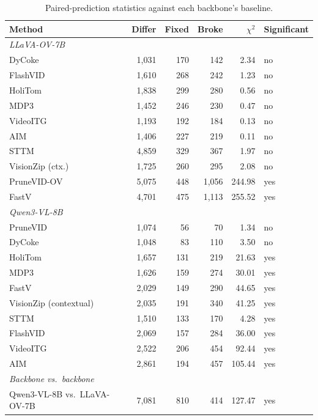 \documentclass[11pt]{article}
\begin{document}
\begin{table}[H]
  \centering
  \small
  \caption{Paired-prediction statistics against each backbone's baseline.}
  \label{tab:verif}
  \begin{tabular}{lrrrrl}
    \toprule
    Method & Differ & Fixed & Broke & $\chi^2$ & Significant \\
    \midrule
    \multicolumn{6}{l}{\textit{LLaVA-OV-7B}} \\
    DyCoke & 1{,}031 & 170 & 142 & 2.34 & no \\
    FlashVID & 1{,}610 & 268 & 242 & 1.23 & no \\
    HoliTom & 1{,}838 & 299 & 280 & 0.56 & no \\
    MDP3 & 1{,}452 & 246 & 230 & 0.47 & no \\
    VideoITG & 1{,}193 & 192 & 184 & 0.13 & no \\
    AIM & 1{,}406 & 227 & 219 & 0.11 & no \\
    STTM & 4{,}859 & 329 & 367 & 1.97 & no \\
    VisionZip (ctx.) & 1{,}725 & 260 & 295 & 2.08 & no \\
    PruneVID-OV & 5{,}075 & 448 & 1{,}056 & 244.98 & yes \\
    FastV & 4{,}701 & 475 & 1{,}113 & 255.52 & yes \\
    \midrule
    \multicolumn{6}{l}{\textit{Qwen3-VL-8B}} \\
    PruneVID & 1{,}074 & 56 & 70 & 1.34 & no \\
    DyCoke & 1{,}048 & 83 & 110 & 3.50 & no \\
    HoliTom & 1{,}657 & 131 & 219 & 21.63 & yes \\
    MDP3 & 1{,}626 & 159 & 274 & 30.01 & yes \\
    FastV & 2{,}029 & 149 & 290 & 44.65 & yes \\
    VisionZip (contextual) & 2{,}035 & 191 & 340 & 41.25 & yes \\
    STTM & 1{,}510 & 133 & 170 & 4.28 & yes \\
    FlashVID & 2{,}069 & 157 & 284 & 36.00 & yes \\
    VideoITG & 2{,}522 & 206 & 454 & 92.44 & yes \\
    AIM & 2{,}861 & 194 & 457 & 105.44 & yes \\
    \midrule
    \multicolumn{6}{l}{\textit{Backbone vs.\ backbone}} \\
    Qwen3-VL-8B vs.\ LLaVA-OV-7B & 7{,}081 & 810 & 414 & 127.47 & yes \\
    \bottomrule
  \end{tabular}
\end{table}
\end{document}
